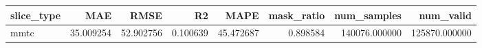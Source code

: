 \begin{tabular}{lrrrrrrr}
\toprule
slice_type & MAE & RMSE & R2 & MAPE & mask_ratio & num_samples & num_valid \\
\midrule
mmtc & 35.009254 & 52.902756 & 0.100639 & 45.472687 & 0.898584 & 140076.000000 & 125870.000000 \\
\bottomrule
\end{tabular}
